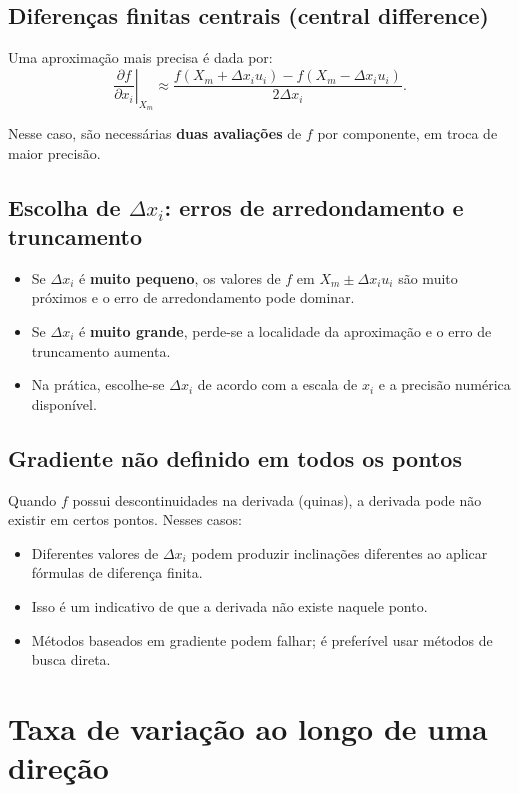\documentclass[9pt,a4paper]{extarticle}
\begin{document}
\subsection{Diferenças finitas centrais (central difference)}

Uma aproximação mais precisa é dada por:
\[
  \left.\frac{\partial f}{\partial x_i}\right|_{X_m}
  \approx
  \frac{ f(X_m + \Delta x_i u_i) - f(X_m - \Delta x_i u_i) }{2\Delta x_i}.
\]

\noindent Nesse caso, são necessárias \textbf{duas avaliações} de $f$ por componente, em troca de maior precisão.

\subsection{Escolha de $\Delta x_i$: erros de arredondamento e truncamento}

\begin{itemize}
    \item Se $\Delta x_i$ é \textbf{muito pequeno}, os valores de $f$ em $X_m \pm \Delta x_i u_i$ são muito próximos e o erro de arredondamento pode dominar.
    \item Se $\Delta x_i$ é \textbf{muito grande}, perde-se a localidade da aproximação e o erro de truncamento aumenta.
    \item Na prática, escolhe-se $\Delta x_i$ de acordo com a escala de $x_i$ e a precisão numérica disponível.
\end{itemize}

\subsection{Gradiente não definido em todos os pontos}

Quando $f$ possui descontinuidades na derivada (quinas), a derivada pode não existir em certos pontos. Nesses casos:

\begin{itemize}
    \item Diferentes valores de $\Delta x_i$ podem produzir inclinações diferentes ao aplicar fórmulas de diferença finita.
    \item Isso é um indicativo de que a derivada não existe naquele ponto.
    \item Métodos baseados em gradiente podem falhar; é preferível usar métodos de busca direta.
\end{itemize}

\section{Taxa de variação ao longo de uma direção}
\end{document}
